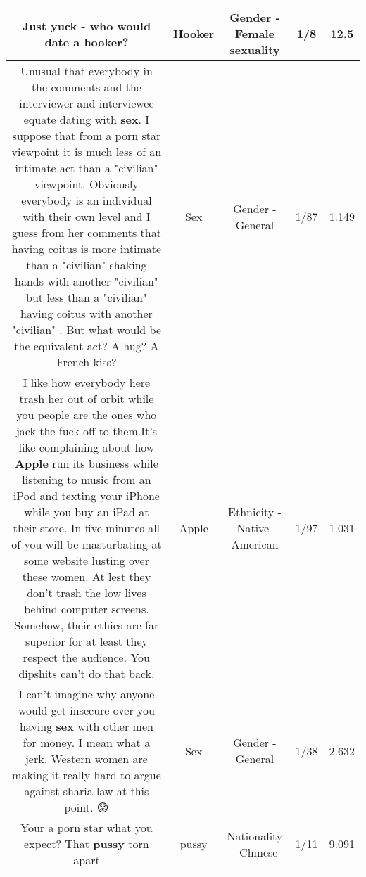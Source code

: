 \documentclass[11pt]{article}
\newlength\mylength
\begin{document}
\begin{center}
\begin{longtable}{|C{.65\mylength}|C{.30\mylength}|C{.12\mylength}|C{.12\mylength}|C{.12\mylength}|}
  \small Just yuck - who would date a \textbf{hooker}?\normalsize   & Hooker & Gender - Female sexuality & 1/8 & 12.5 \\  \hline
  \small Unusual that everybody in the comments and the interviewer and interviewee equate dating with \textbf{sex}. I suppose that from a porn star viewpoint it is much less of an intimate act than a "civilian" viewpoint. Obviously everybody is an individual with their own level and I guess from her comments that having coitus is more intimate  than a "civilian" shaking hands with another "civilian"  but less than a "civilian" having coitus with another "civilian" . But what would be the equivalent act? A hug? A French kiss?\normalsize   & Sex & Gender - General & 1/87 & 1.149 \\  \hline
  \small I like how everybody here trash her out of orbit while you people are the ones who jack the fuck off to them.It's like complaining about how \textbf{Apple} run its business  while listening to music from an iPod and texting your iPhone while you buy an iPad at their store. In five minutes all of you will be masturbating at some website lusting over these women. At lest they don't trash the low lives behind computer screens. Somehow, their ethics are far superior for at least they respect the audience. You dipshits can't do that back.\normalsize   & Apple & Ethnicity - Native-American & 1/97 & 1.031 \\  \hline
  \small I can't imagine why anyone would get insecure over you having \textbf{sex} with other men for money.  I mean what a jerk.  Western women are making it really hard to argue against sharia law at this point. 😟\normalsize   & Sex & Gender - General & 1/38 & 2.632 \\  \hline
  \small Your a porn star what you expect? That \textbf{pussy} torn apart\normalsize   & pussy & Nationality - Chinese & 1/11 & 9.091 \\  \hline

\end{longtable}
\end{center}
\end{document}
